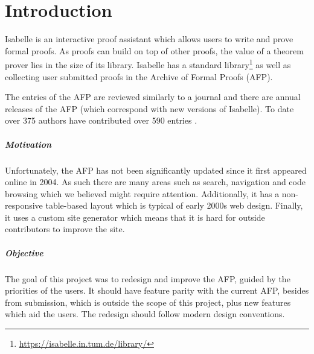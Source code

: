 \documentclass[bsc,frontabs,oneside,singlespacing,parskip,deptreport,logo]{infthesis}
\begin{document}
\chapter{Introduction}


Isabelle \cite{isabelle_isar} is an interactive proof assistant which allows users to write and prove formal proofs. As proofs can build on top of other proofs, the value of a theorem prover lies in the size of its library. Isabelle has a standard library\footnote{\url{https://isabelle.in.tum.de/library/}} as well as collecting user submitted proofs in the Archive of Formal Proofs (AFP).


The entries of the AFP are reviewed similarly to a journal and there are annual releases of the AFP (which correspond with new versions of Isabelle). To date over 375 authors have contributed over 590 entries \cite{afp_statistics}.

\paragraph*{Motivation}

Unfortunately, the AFP has not been significantly updated since it first appeared online in 2004. As such there are many areas such as search, navigation and code browsing which we believed might require attention. Additionally, it has a non-responsive table-based layout which is typical of early 2000s web design. Finally, it uses a custom site generator which means that it is hard for outside contributors to improve the site.

\paragraph*{Objective}

The goal of this project was to redesign and improve the AFP, guided by the priorities of the users. It should have feature parity with the current AFP, besides from submission, which is outside the scope of this project, plus new features which aid the users. The redesign should follow modern design conventions.
\end{document}
